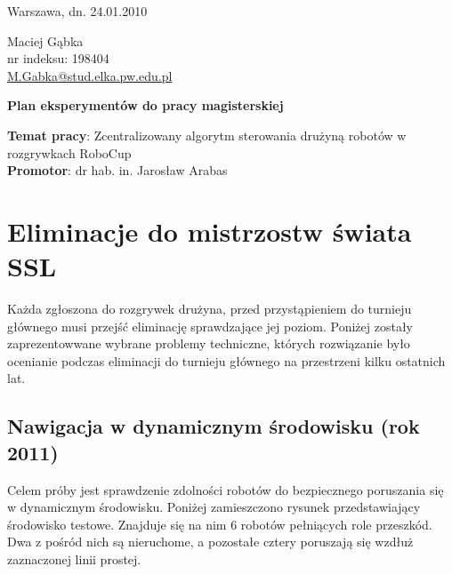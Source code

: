 \documentclass[11pt,onecolumn,a4paper,final]{article}
\begin{document}
 

\begin{flushright}
	Warszawa, dn. 24.01.2010
\end{flushright}

\vspace{-1.45cm}

\begin{flushleft}
	Maciej Gąbka \\  nr indeksu: 198404 \\ \url{M.Gabka@stud.elka.pw.edu.pl}
\end{flushleft}

\vspace{0.5cm}

\begin{center}
	\LARGE \bfseries Plan eksperymentów do pracy magisterskiej \\
\end{center}

\vspace{1cm}

\begin{center}
\textbf{Temat pracy}: Zcentralizowany algorytm sterowania drużyną robotów w rozgrywkach RoboCup\\
\textbf{Promotor}: dr hab. in. Jarosław Arabas\
\end{center}

\section*{Eliminacje do mistrzostw świata SSL}
Każda zgłoszona do rozgrywek drużyna, przed przystąpieniem do turnieju głównego musi przejść eliminację sprawdzające jej poziom.
Poniżej zostały zaprezentowwane wybrane problemy techniczne, których rozwiązanie było ocenianie podczas eliminacji do turnieju głównego na przestrzeni
kilku ostatnich lat\cite{robocup_www}.

  \subsection*{ Nawigacja w dynamicznym środowisku (rok 2011)}
  Celem próby jest sprawdzenie zdolności robotów do bezpiecznego poruszania się w dynamicznym środowisku. Poniżej zamieszczono rysunek przedstawiający 
  środowisko testowe. Znajduje się na nim 6 robotów pełniących role przeszkód. Dwa z pośród nich są nieruchome, a pozostałe cztery poruszają się wzdłuż
  zaznaczonej linii prostej.
\end{document}
